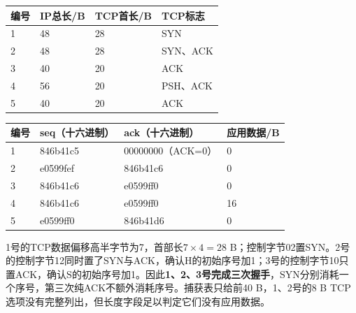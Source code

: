 \begin{wideblock}

\par\medskip\noindent\begin{minipage}{\linewidth}\fontsize{9.3}{12}\selectfont\begin{tabularx}{\linewidth}{@{}YYYY@{}}
\toprule\noalign{}
编号 & IP总长/B & TCP首长/B & TCP标志 \\
\midrule\noalign{}


1 & 48 & 28 & SYN \\
2 & 48 & 28 & SYN、ACK \\
3 & 40 & 20 & ACK \\
4 & 56 & 20 & PSH、ACK \\
5 & 40 & 20 & ACK \\
\bottomrule\end{tabularx}
\end{minipage}\par\medskip

\end{wideblock}

\begin{wideblock}

\par\medskip\noindent\begin{minipage}{\linewidth}\fontsize{9.3}{12}\selectfont\begin{tabularx}{\linewidth}{@{}YYYY@{}}
\toprule\noalign{}
编号 & seq（十六进制） & ack（十六进制） & 应用数据/B \\
\midrule\noalign{}


1 & 846b41c5 & 00000000（ACK=0） & 0 \\
2 & e0599fef & 846b41c6 & 0 \\
3 & 846b41c6 & e0599ff0 & 0 \\
4 & 846b41c6 & e0599ff0 & 16 \\
5 & e0599ff0 & 846b41d6 & 0 \\
\bottomrule\end{tabularx}
\end{minipage}\par\medskip

\end{wideblock}

1号的TCP数据偏移高半字节为7，首部长\(7\times4=28\) B；控制字节02置SYN。2号的控制字节12同时置了SYN与ACK，确认H的初始序号加1；3号的控制字节10只置ACK，确认S的初始序号加1。因此\textbf{1、2、3号完成三次握手}，SYN分别消耗一个序号，第三次纯ACK不额外消耗序号。捕获表只给前40 B，1、2号的8 B TCP选项没有完整列出，但长度字段足以判定它们没有应用数据。

